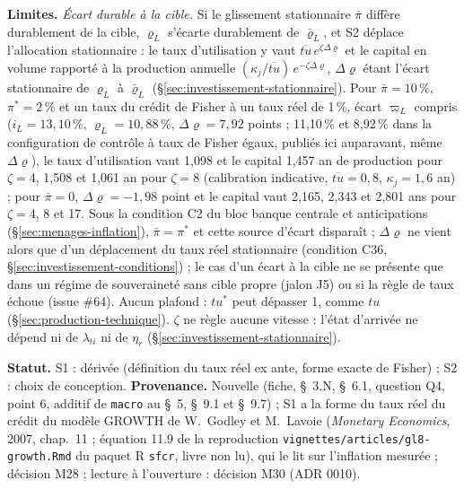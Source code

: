 \documentclass[11pt,a4paper]{article}
\newcommand{\limites}{\par\noindent\textbf{Limites.} }
\begin{document}
\begin{proposee}
\limites \emph{Écart durable à la cible.} Si le glissement stationnaire $\bar\pi$ diffère durablement de la cible, $\varrho_L$ s'écarte durablement de $\bar\varrho_L$, et S2 déplace l'allocation stationnaire : le taux d'utilisation y vaut $\overline{\mathit{tu}}\,e^{\zeta\Delta\varrho}$ et le capital en volume rapporté à la production annuelle $(\kappa_j/\overline{\mathit{tu}})\,e^{-\zeta\Delta\varrho}$, $\Delta\varrho$ étant l'écart stationnaire de $\varrho_L$ à $\bar\varrho_L$ (\S\ref{sec:investissement-stationnaire}). Pour $\bar\pi = 10\,\%$, $\pi^\ast = 2\,\%$ et un taux du crédit de Fisher à un taux réel de 1\,\%, écart $\varpi_L$ compris ($i_L = 13{,}10\,\%$, $\varrho_L = 10{,}88\,\%$, $\Delta\varrho = 7{,}92$ points  ; 11,10\,\% et 8,92\,\% dans la configuration de contrôle à taux de Fisher égaux, publiés ici auparavant, même $\Delta\varrho$), le taux d'utilisation vaut 1,098 et le capital 1,457 an de production pour $\zeta = 4$, 1,508 et 1,061 an pour $\zeta = 8$ (calibration indicative, $\overline{\mathit{tu}} = 0{,}8$, $\kappa_j = 1{,}6$ an) ; pour $\bar\pi = 0$, $\Delta\varrho = -1{,}98$ point et le capital vaut 2,165, 2,343 et 2,801 ans pour $\zeta = 4$, 8 et 17. Sous la condition C2 du bloc banque centrale et anticipations (\S\ref{sec:menages-inflation}), $\bar\pi = \pi^\ast$ et cette source d'écart disparaît ; $\Delta\varrho$ ne vient alors que d'un déplacement du taux réel stationnaire (condition C36, \S\ref{sec:investissement-conditions}) ; le cas d'un écart à la cible ne se présente que dans un régime de souveraineté sans cible propre (jalon J5) ou si la règle de taux échoue (issue \#64). Aucun plafond : $\mathit{tu}^\ast$ peut dépasser 1, comme $\mathit{tu}$ (\S\ref{sec:production-technique}). $\zeta$ ne règle aucune vitesse : l'état d'arrivée ne dépend ni de $\lambda_{\mathit{ti}}$ ni de $\eta_r$ (\S\ref{sec:investissement-stationnaire}).

\textbf{Statut.} S1 : dérivée (définition du taux réel ex ante, forme exacte de Fisher) ; S2 : choix de conception. \textbf{Provenance.} Nouvelle (fiche, \S~3.N, \S~6.1, question Q4, point 6, additif de \texttt{macro} au \S~5, \S~9.1 et \S~9.7) ; S1 a la forme du taux réel du crédit du modèle GROWTH de W.~Godley et M.~Lavoie (\emph{Monetary Economics}, 2007, chap.~11 ; équation 11.9 de la reproduction \nolinkurl{vignettes/articles/gl8-growth.Rmd} du paquet R \texttt{sfcr}, livre non lu), qui le lit sur l'inflation mesurée ; décision M28 ; lecture à l'ouverture : décision M30 (ADR 0010).
\end{proposee}
\end{document}
